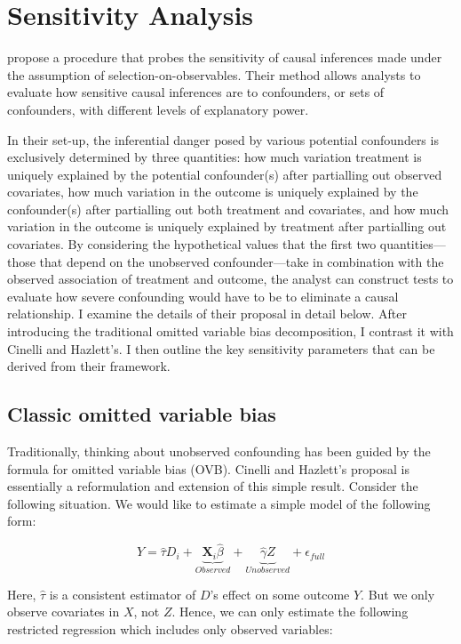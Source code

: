 \documentclass[hidelinks,11pt]{article}
\begin{document}
\section{Sensitivity Analysis}

\citet{cinellihazlett2020} propose a procedure that probes the sensitivity of causal inferences made under the assumption of selection-on-observables. Their method allows analysts to evaluate how sensitive causal inferences are to confounders, or sets of confounders, with different levels of explanatory power.

In their set-up, the inferential danger posed by various potential confounders is exclusively determined by three quantities: how much variation treatment is uniquely explained by the potential confounder(s) after partialling out observed covariates, how much variation in the outcome is uniquely explained by the confounder(s) after partialling out both treatment and covariates, and how much variation in the outcome is uniquely explained by treatment after partialling out covariates. By considering the hypothetical values that the first two quantities---those that depend on the unobserved confounder---take in combination with the observed association of treatment and outcome, the analyst can construct tests to evaluate how severe confounding would have to be to eliminate a causal relationship. I examine the details of their proposal in detail below. After introducing the traditional omitted variable bias decomposition, I contrast it with Cinelli and Hazlett's. I then outline the key sensitivity parameters that can be derived from their framework.

\subsection{Classic omitted variable bias}

Traditionally, thinking about unobserved confounding has been guided by the formula for omitted variable bias (OVB). Cinelli and Hazlett's proposal is essentially a reformulation and extension of this simple result. Consider the following situation. We would like to estimate a simple model of the following form:

$$Y = \hat \tau D_i + \underbrace{\pmb{X}_i\hat \beta}_{Observed} + \underbrace{\hat \gamma Z}_{Unobserved} + \epsilon_{full}$$

Here, $\hat \tau$ is a consistent estimator of $D$'s effect on some outcome $Y$. But we only observe covariates in $X$, not $Z$. Hence, we can only estimate the following restricted regression which includes only observed variables:
\end{document}
